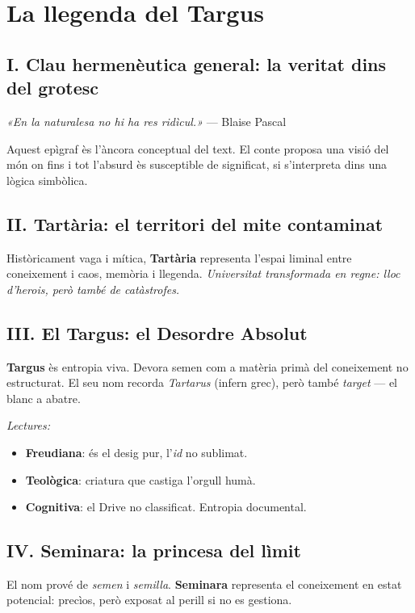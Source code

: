 \section*{La llegenda del Targus}

\subsection*{I. Clau hermen\`eutica general: la veritat dins del grotesc}
\emph{«En la naturalesa no hi ha res rid\`icul.»} — Blaise Pascal

Aquest ep\`igraf \`es l’\`ancora conceptual del text. El conte proposa una visi\'o del m\'on on fins i tot l’absurd \`es susceptible de significat, si s’interpreta dins una l\`ogica simb\`olica.

\subsection*{II. Tart\`aria: el territori del mite contaminat}
Hist\`oricament vaga i m\'itica, \textbf{Tart\`aria} representa l’espai liminal entre coneixement i caos, mem\`oria i llegenda. \textit{Universitat transformada en regne: lloc d’herois, per\`o tamb\'e de cat\`astrofes.}

\subsection*{III. El Targus: el Desordre Absolut}
\textbf{Targus} \`es entropia viva. Devora semen com a mat\`eria prim\`a del coneixement no estructurat. El seu nom recorda \emph{Tartarus} (infern grec), per\`o tamb\'e \textit{target} — el blanc a abatre.

\textit{Lectures:}
\begin{itemize}
  \item \textbf{Freudiana}: és el desig pur, l’\textit{id} no sublimat.
  \item \textbf{Teol\`ogica}: criatura que castiga l’orgull hum\`a.
  \item \textbf{Cognitiva}: el Drive no classificat. Entropia documental.
\end{itemize}

\subsection*{IV. Seminara: la princesa del l\`imit}
El nom prov\'e de \emph{semen} i \emph{semilla}. \textbf{Seminara} representa el coneixement en estat potencial: prec\`ios, per\`o exposat al perill si no es gestiona.

